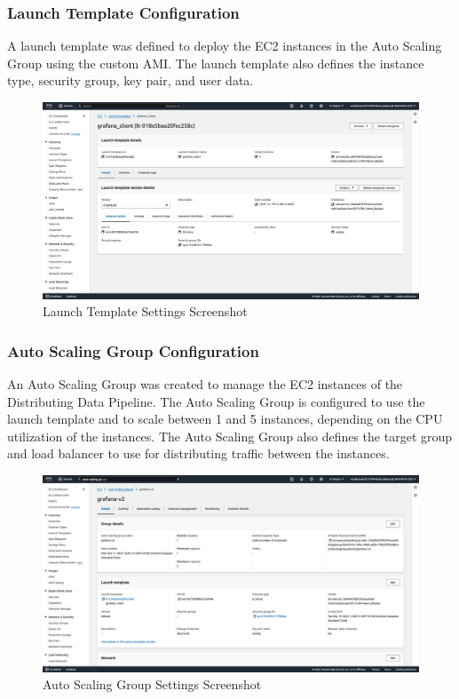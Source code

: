 \documentclass[12pt,oneside]{book} %
\begin{document}
\newpage 
\subsubsection{Launch Template Configuration}
A launch template was defined to deploy the EC2 instances in the Auto Scaling
Group using the custom AMI. The launch template also defines the instance type,
security group, key pair, and user data.
\begin{figure}[H]
    \centering
    \includegraphics[width=1\linewidth]{images/launch-template.png}
    \caption{Launch Template Settings Screenshot}
\end{figure}

\newpage
\subsubsection{Auto Scaling Group Configuration}
An Auto Scaling Group was created to manage the EC2 instances of the
Distributing Data Pipeline. The Auto Scaling Group is configured to use the
launch template and to scale between 1 and 5 instances, depending on the CPU
utilization of the instances. The Auto Scaling Group also defines the target
group and load balancer to use for distributing traffic between the instances.
\begin{figure}[H]
    \centering
    \includegraphics[width=1\linewidth]{images/auto-scaling-group.png}
    \caption{Auto Scaling Group Settings Screenshot}
\end{figure}
\end{document}
